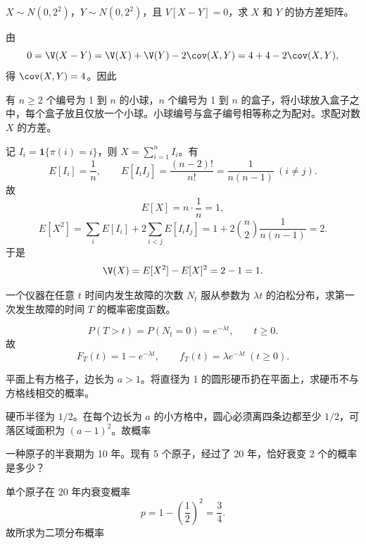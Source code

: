 
\begin{question}
$X\sim N(0,2^2)$，$Y\sim N(0,2^2)$，且 $V[X-Y]=0$，求 $X$ 和 $Y$ 的协方差矩阵。
\begin{solution}
由
\[
0=\V(X-Y)=\V(X)+\V(Y)-2\cov(X,Y)
=4+4-2\cov(X,Y),
\]
得 $\cov(X,Y)=4$。因此
\end{solution}
\end{question}

\begin{question}
有 $n\ge2$ 个编号为 1 到 $n$ 的小球，$n$ 个编号为 1 到 $n$ 的盒子，将小球放入盒子之中，每个盒子放且仅放一个小球。小球编号与盒子编号相等称之为配对。求配对数 $X$ 的方差。
\begin{solution}
记 $I_i=\mathbf 1\{\pi(i)=i\}$，则 $X=\sum_{i=1}^n I_i$。有
\[
E[I_i]=\frac1n,
\qquad E[I_iI_j]=\frac{(n-2)!}{n!}=\frac{1}{n(n-1)}\ (i\ne j).
\]
故
\[
E[X]=n\cdot\frac1n=1,
\]
\[
E[X^2]=\sum_iE[I_i]+2\sum_{i<j}E[I_iI_j]
=1+2\binom n2\frac{1}{n(n-1)}=2.
\]
于是
\[
\V(X)=E[X^2]-E[X]^2=2-1=1.
\]
\end{solution}
\end{question}

\begin{question}
一个仪器在任意 $t$ 时间内发生故障的次数 $N_t$ 服从参数为 $\lambda t$ 的泊松分布，求第一次发生故障的时间 $T$ 的概率密度函数。
\begin{solution}
\[
P(T>t)=P(N_t=0)=e^{-\lambda t},\qquad t\ge 0.
\]
故
\[
F_T(t)=1-e^{-\lambda t},\qquad
f_T(t)=\lambda e^{-\lambda t}\ (t\ge 0).
\]
\end{solution}
\end{question}

\begin{question}
平面上有方格子，边长为 $a>1$。将直径为 1 的圆形硬币扔在平面上，求硬币不与方格线相交的概率。
\begin{solution}
硬币半径为 $1/2$。在每个边长为 $a$ 的小方格中，圆心必须离四条边都至少 $1/2$，可落区域面积为 $(a-1)^2$。故概率
\end{solution}
\end{question}

\begin{question}
一种原子的半衰期为 10 年。现有 5 个原子，经过了 20 年，恰好衰变 2 个的概率是多少？
\begin{solution}
单个原子在 $20$ 年内衰变概率
\[
p=1-\left(\frac12\right)^2=\frac34.
\]
故所求为二项分布概率
\end{solution}
\end{question}

